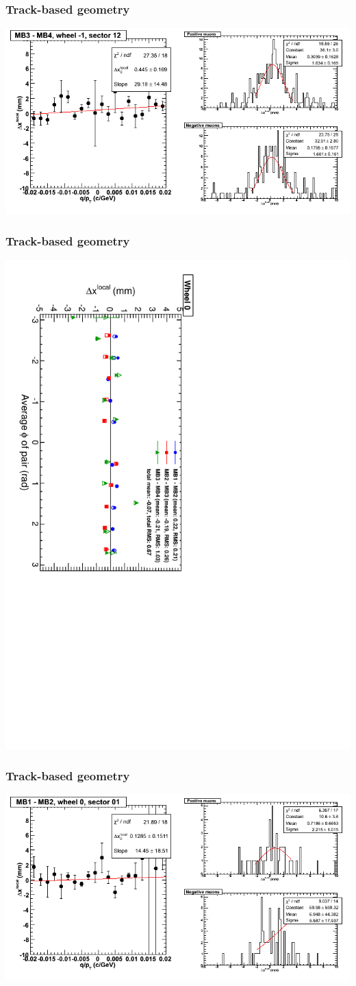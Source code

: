 \documentclass[compress]{beamer}
\begin{document}
\begin{frame}
\frametitle{Track-based geometry}
\includegraphics[width=\linewidth]{NOV4_segdiffs/dt13_resid_B_12_34.png}
\end{frame}

\begin{frame}
\frametitle{Track-based geometry}
\includegraphics[height=\linewidth, angle=90]{NOV4_segdiff_x_whze.pdf}
\end{frame}

\begin{frame}
\frametitle{Track-based geometry}
\includegraphics[width=\linewidth]{NOV4_segdiffs/dt13_resid_C_01_12.png}
\end{frame}
\end{document}
